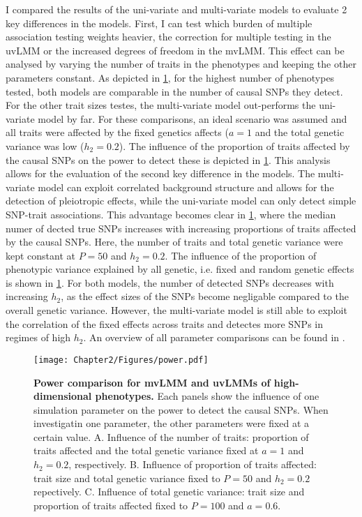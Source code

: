 I compared the results of the uni-variate and multi-variate models to evaluate \num{2} key differences in the models. First, I can test which burden of multiple association testing weights heavier, the correction for multiple testing in the uvLMM or the increased degrees of freedom in the mvLMM. This effect can be analysed by varying the number of traits in the phenotypes and keeping the other parameters constant. As depicted in \cref{fig:power}, for the highest number of phenotypes tested, both models are comparable in the number of causal SNPs they detect. For the other trait sizes testes, the multi-variate model out-performs the uni-variate model by far. For these comparisons, an ideal scenario was assumed and all traits were affected by the fixed genetics affects (\(a=1\) and the total genetic variance was low (\(h_2=0.2\)). The influence of the proportion of traits affected by the causal SNPs on the power to detect these is depicted in \cref{fig:power}. This analysis allows for the evaluation of the second key difference in the models. The multi-variate model can exploit correlated background structure and allows for the detection of pleiotropic effects, while the uni-variate model can only detect simple SNP-trait associations. This advantage becomes clear in \cref{fig:power}, where the median numer of dected true SNPs increases with increasing proportions of traits affected by the causal SNPs.  Here, the number of traits and total genetic variance were kept constant at \(P=50\) and \(h_2=0.2\). The influence of the proportion of phenotypic variance explained by all genetic, i.e. fixed and random genetic effects is shown in \cref{fig:power}. For both models, the number of detected SNPs decreases with increasing \(h_2\), as the effect sizes of the SNPs become negligable compared to the overall genetic variance. However, the multi-variate model is still able to exploit the correlation of the fixed effects across traits and detectes more SNPs in regimes of high  \(h_2\). An overview of all parameter comparisons can be found in . 
 
\begin{figure}[hbtp]
	\centering
	\texttt{[image: Chapter2/Figures/power.pdf]}
	\caption[\textbf{Power comparison for mvLMM and uvLMMs of high-dimensional phenotypes.}]{\textbf{Power comparison for mvLMM and uvLMMs of high-dimensional phenotypes.} Each panels show the influence of one simulation parameter on the power to detect the causal SNPs. When investigatin one parameter, the other parameters were fixed at a certain value. A. Influence of the number of traits: proportion of traits affected and the total genetic variance fixed at \(a=1\) and \(h_2=0.2\), respectively. B. Influence of proportion of traits affected: trait size and total genetic variance fixed to \(P=50\) and \(h_2=0.2\) repectively. C. Influence of total genetic variance:  trait size and  proportion of traits affected fixed to \(P=100\) and \(a=0.6\).} 
 	\label{fig:power}
\end{figure}

